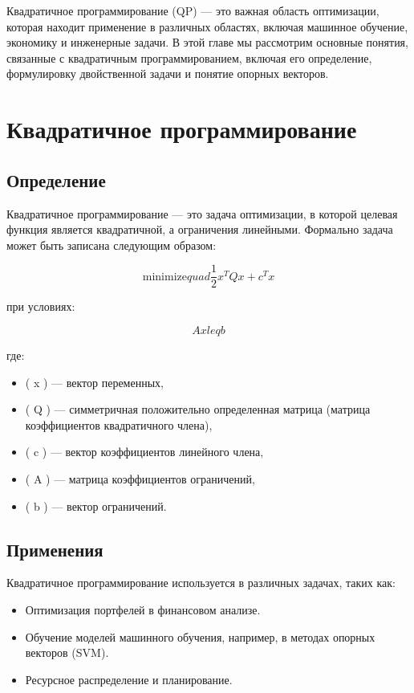 Квадратичное программирование (QP) — это важная область оптимизации, которая находит применение в различных областях, включая машинное обучение, экономику и инженерные задачи. В этой главе мы рассмотрим основные понятия, связанные с квадратичным программированием, включая его определение, формулировку двойственной задачи и понятие опорных векторов.

\section{Квадратичное программирование}

\subsection{Определение}

Квадратичное программирование — это задача оптимизации, в которой целевая функция является квадратичной, а ограничения линейными. Формально задача может быть записана следующим образом:

\[
    \text{minimize} quad \frac{1}{2} x^T Q x + c^T x
\]

при условиях:

\[
    Ax leq b
\]

где:
\begin{itemize}
    \item ( x ) — вектор переменных,
    \item ( Q ) — симметричная положительно определенная матрица (матрица коэффициентов квадратичного члена),
    \item ( c ) — вектор коэффициентов линейного члена,
    \item ( A ) — матрица коэффициентов ограничений,
    \item ( b ) — вектор ограничений.
\end{itemize}

\subsection{Применения}

Квадратичное программирование используется в различных задачах, таких как:
\begin{itemize}
    \item Оптимизация портфелей в финансовом анализе.
    \item Обучение моделей машинного обучения, например, в методах опорных векторов (SVM).
    \item Ресурсное распределение и планирование.
\end{itemize}

